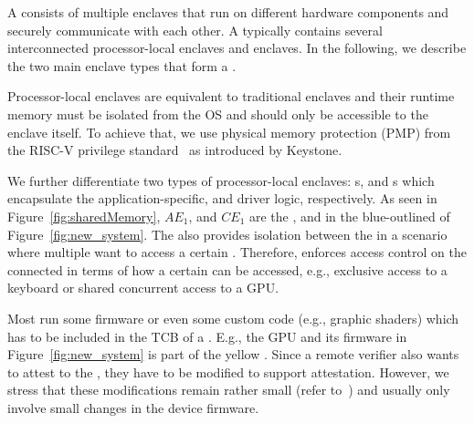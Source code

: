 A \nameenclave{} consists of multiple enclaves that run on different hardware components and securely communicate with each other. A \nameenclave{} typically contains several interconnected processor-local enclaves and \sphw enclaves. In the following, we describe the two main enclave types that form a \nameenclave{}.

\label{sec:overview:enclaves:processorEnclave}

Processor-local enclaves are equivalent to traditional enclaves and their runtime memory must be isolated from the OS and should only be accessible to the enclave itself. To achieve that, we use physical memory protection (PMP) from the RISC-V privilege standard~\cite{riscv2019privspec} as introduced by Keystone.

We further differentiate two types of processor-local enclaves: \app{}s, and \ce{}s which encapsulate the application-specific, and driver logic, respectively. As seen in Figure~\ref{fig:sharedMemory}, $AE_1$, and $CE_1$ are the \app, and \ce in the blue-outlined \nameenclave of Figure~\ref{fig:new_system}. The \ce also provides isolation between the \apps in a scenario where multiple \apps want to access a certain \sphw. Therefore, \ce enforces access control on the connected \apps in terms of how a certain \sphw can be accessed, e.g., exclusive access to a keyboard or shared concurrent access to a GPU. 

\label{sec:overview:enclaves:peripheralEnclave}
Most \sphw run some firmware or even some custom code (e.g., graphic shaders) which has to be included in the TCB of a \nameenclave.
E.g., the GPU and its firmware in Figure~\ref{fig:new_system} is part of the yellow \nameenclave. Since a remote verifier also wants to attest to the \sphw, they have to be modified to support attestation. However, we stress that these modifications  remain rather small (refer to~) and usually only involve small changes in the device firmware. %

